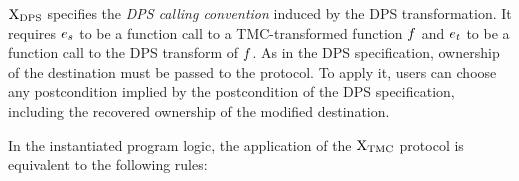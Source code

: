 $\mathrm{X}_\mathrm{DPS}$ specifies the \emph{DPS calling convention} induced by the DPS transformation.
It requires $\datalangExpr_s$ to be a function call to a TMC-transformed function $\datalangFn$ and $\datalangExpr_t$ to be a function call to the DPS transform of $\datalangFn$.
As in the DPS specification, ownership of the destination must be passed to the protocol.
To apply it, users can choose any postcondition implied by the postcondition of the DPS specification, including the recovered ownership of the modified destination.

In the instantiated program logic, the application of the $\mathrm{X}_\mathrm{TMC}$ protocol is equivalent to the following rules:

